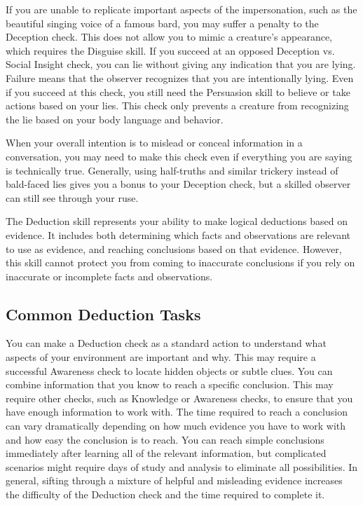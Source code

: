         If you are unable to replicate important aspects of the impersonation, such as the beautiful singing voice of a famous bard, you may suffer a penalty to the Deception check.
        This does not allow you to mimic a creature's appearance, which requires the Disguise skill.
         If you succeed at an opposed Deception vs. Social Insight check, you can lie without giving any indication that you are lying.
        Failure means that the observer recognizes that you are intentionally lying.
        Even if you succeed at this check, you still need the Persuasion skill to believe or take actions based on your lies.
        This check only prevents a creature from recognizing the lie based on your body language and behavior.

        When your overall intention is to mislead or conceal information in a conversation, you may need to make this check even if everything you are saying is technically true.
        Generally, using half-truths and similar trickery instead of bald-faced lies gives you a bonus to your Deception check, but a skilled observer can still see through your ruse.


\newpage
{}
    The Deduction skill represents your ability to make logical deductions based on evidence.
    It includes both determining which facts and observations are relevant to use as evidence, and reaching conclusions based on that evidence.
    However, this skill cannot protect you from coming to inaccurate conclusions if you rely on inaccurate or incomplete facts and observations.

    \subsection{Common Deduction Tasks}
         You can make a Deduction check as a standard action to understand what aspects of your environment are important and why.
        This may require a successful Awareness check to locate hidden objects or subtle clues.
         You can combine information that you know to reach a specific conclusion.
        This may require other checks, such as Knowledge or Awareness checks, to ensure that you have enough information to work with.
        The time required to reach a conclusion can vary dramatically depending on how much evidence you have to work with and how easy the conclusion is to reach.
        You can reach simple conclusions immediately after learning all of the relevant information, but complicated scenarios might require days of study and analysis to eliminate all possibilities.
        In general, sifting through a mixture of helpful and misleading evidence increases the difficulty of the Deduction check and the time required to complete it.

